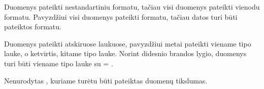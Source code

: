 \documentclass[letterpaper,10pt,lithuanian]{sphinxmanual}
\begin{document}
\begin{fulllineitems}
\begin{sphinxShadowBox}
\begin{description}
\sphinxAtStartPar
Duomenys pateikti nestandartiniu formatu, tačiau visi duomenys
pateikti vienodu formatu. Pavyzdžiui visi duomenys pateikti
 formatu, tačiau datos turi būti pateiktos 
formatu.

\sphinxAtStartPar
Duomenys pateikti atskiruose laukuose, pavyzdžiui metai pateikti
viename  tipo lauke, o ketvirtis, kitame  tipo
lauke. Norint didesnio brandos lygio, duomenys turi būti viename
 tipo lauke su {\hyperref[\detokenize{dimensijos:property.ref}]{}} = .

\sphinxAtStartPar
Nenurodytas {\hyperref[\detokenize{dimensijos:property.ref}]{}}, kuriame turėtu būti pateiktas
duomenų tikslumas.

\end{description}
\end{sphinxShadowBox}

\end{fulllineitems}

\end{document}
